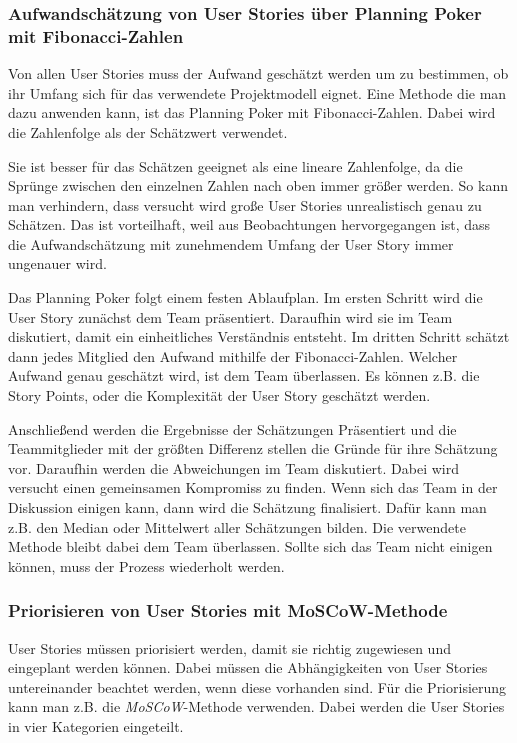 \documentclass[acmtog]{acmart}
\begin{document}
\subsubsection{Aufwandschätzung von User Stories über Planning Poker mit Fibonacci-Zahlen} \label{sec:effort}

Von allen User Stories muss der Aufwand geschätzt werden um zu bestimmen, ob ihr Umfang sich für das verwendete Projektmodell eignet. 
Eine Methode die man dazu anwenden kann, ist das Planning Poker mit Fibonacci-Zahlen. Dabei wird die Zahlenfolge als der Schätzwert verwendet. \cite{planingpoker}

Sie ist besser für das Schätzen geeignet als eine lineare Zahlenfolge, da die Sprünge zwischen den einzelnen Zahlen nach oben immer größer werden. So kann man 
verhindern, dass versucht wird große User Stories unrealistisch genau zu Schätzen. Das ist vorteilhaft, weil aus Beobachtungen hervorgegangen ist, dass 
die Aufwandschätzung mit zunehmendem Umfang der User Story immer ungenauer wird. \cite{planingpoker}

Das Planning Poker folgt einem festen Ablaufplan. Im ersten Schritt wird die User Story zunächst dem Team präsentiert. Daraufhin wird sie im Team diskutiert, 
damit ein einheitliches Verständnis entsteht. Im dritten Schritt schätzt dann jedes Mitglied den Aufwand mithilfe der Fibonacci-Zahlen. Welcher Aufwand genau 
geschätzt wird, ist dem Team überlassen. Es können z.B. die Story Points, oder die Komplexität der User Story geschätzt werden. \cite{planingpoker}

Anschließend werden die Ergebnisse der Schätzungen Präsentiert und die Teammitglieder mit der größten Differenz stellen die Gründe für ihre Schätzung vor. 
Daraufhin werden die Abweichungen im Team diskutiert. Dabei wird versucht einen gemeinsamen Kompromiss zu finden. Wenn sich das Team in der Diskussion einigen kann, dann wird die Schätzung finalisiert. 
Dafür kann man z.B. den Median oder Mittelwert aller Schätzungen bilden. Die verwendete Methode bleibt dabei dem Team überlassen. Sollte sich das Team nicht einigen können, muss der Prozess wiederholt werden. \cite{planingpoker}

\subsubsection{Priorisieren von User Stories mit MoSCoW-Methode} \label{sec:priorization}

User Stories müssen priorisiert werden, damit sie richtig zugewiesen und eingeplant werden können. Dabei müssen die Abhängigkeiten von User Stories untereinander 
beachtet werden, wenn diese vorhanden sind. Für die Priorisierung kann man z.B. die \emph{MoSCoW}-Methode verwenden. Dabei werden die User Stories in vier Kategorien eingeteilt. \cite{moscow}
\end{document}
